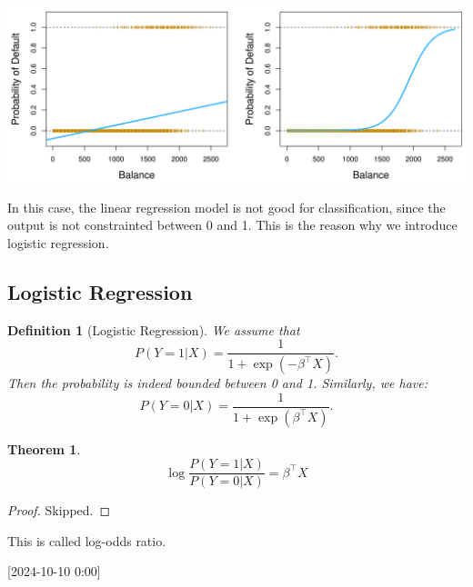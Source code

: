 \documentclass{article}
\theoremstyle{MyNonumberplain}
\theoremstyle{break}
\newtheorem*{proof}{Proof. }
\newcommand{\T}{^\intercal}
\theoremstyle{break}
\newtheorem{theorem}{Theorem}[section]
\theoremstyle{break}
\theoremstyle{break}
\newtheorem{definition}{Definition}[section]
\begin{document}
\begin{center}
    \includegraphics*[scale=0.2]{Images/img19.png}
\end{center}

In this case, the linear regression model is not good for classification, since the output is not constrainted between 0 and 1.
This is the reason why we introduce logistic regression.

\subsection{Logistic Regression}

\begin{defbox}
    \begin{definition}[Logistic Regression]
        We assume that 
        $$
        P(Y=1|X)=\frac{1}{1+\exp(-\beta\T X)}.
        $$
        Then the probability is indeed bounded between 0 and 1. Similarly, we have:
        $$
        P(Y=0|X)=\frac{1}{1+\exp(\beta\T X)}.
        $$        
    \end{definition}
\end{defbox}

\begin{thmbox}
    \begin{theorem}
        $$\log{\frac{P(Y=1|X)}{P(Y=0|X)}}=\beta\T X$$
    \end{theorem}
    \begin{prfbox}
        \begin{proof}
            Skipped.
        \end{proof}
    \end{prfbox}
    This is called log-odds ratio.
\end{thmbox}



[2024-10-10 0:00]
\end{document}
